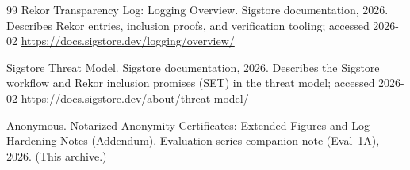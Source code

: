 \documentclass[11pt]{article}
\begin{document}
\begin{thebibliography}{99}
\newblock Rekor Transparency Log: Logging Overview.
\newblock Sigstore documentation, 2026.
\newblock Describes Rekor entries, inclusion proofs, and verification tooling; accessed 2026-02
\newblock \url{https://docs.sigstore.dev/logging/overview/}

\newblock Sigstore Threat Model.
\newblock Sigstore documentation, 2026.
\newblock Describes the Sigstore workflow and Rekor inclusion promises (SET) in the threat model; accessed 2026-02
\newblock \url{https://docs.sigstore.dev/about/threat-model/}

Anonymous.
\newblock Notarized Anonymity Certificates: Extended Figures and Log-Hardening Notes (Addendum).
\newblock Evaluation series companion note (Eval~1A), 2026. (This archive.)

\end{thebibliography}
\end{document}
